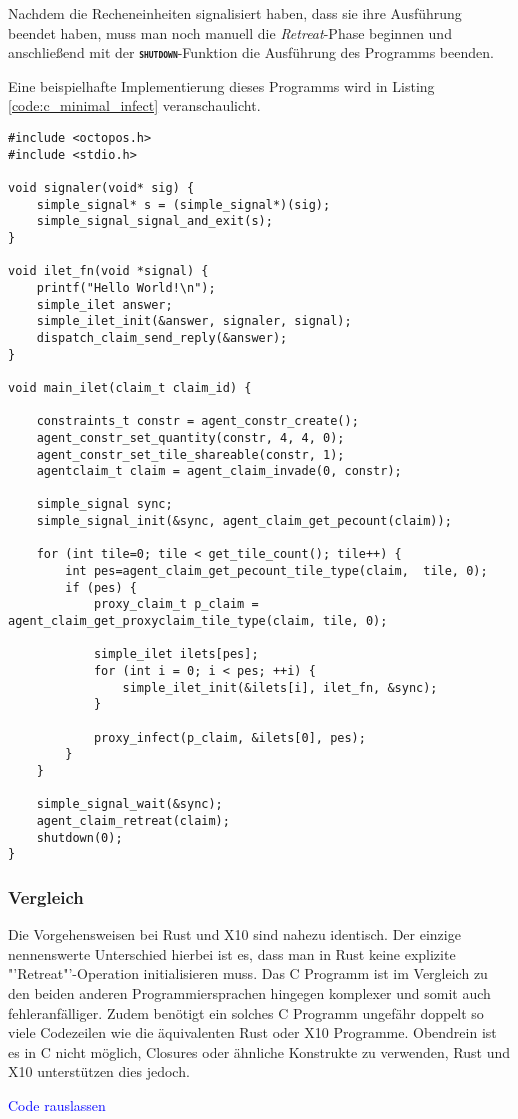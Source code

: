 Nachdem die Recheneinheiten signalisiert haben, dass sie ihre Ausführung beendet haben, muss man noch manuell
die \textit{Retreat}-Phase beginnen und anschließend mit der \texttt{\textsc{\textbf{shutdown}}}-Funktion
die Ausführung des Programms beenden.

Eine beispielhafte Implementierung dieses Programms wird in Listing \ref{code:c_minimal_infect} veranschaulicht.

\lstset{basicstyle=\tiny}
\begin{lstlisting}[float,caption={Minimales Invade, Infect, Retreat in C},label=code:c_minimal_infect]
#include <octopos.h>
#include <stdio.h>

void signaler(void* sig) {
    simple_signal* s = (simple_signal*)(sig);
    simple_signal_signal_and_exit(s);
}

void ilet_fn(void *signal) {
    printf("Hello World!\n");
    simple_ilet answer;
    simple_ilet_init(&answer, signaler, signal);
    dispatch_claim_send_reply(&answer);
}

void main_ilet(claim_t claim_id) {

    constraints_t constr = agent_constr_create();
    agent_constr_set_quantity(constr, 4, 4, 0);
    agent_constr_set_tile_shareable(constr, 1);
    agentclaim_t claim = agent_claim_invade(0, constr);

    simple_signal sync;
    simple_signal_init(&sync, agent_claim_get_pecount(claim));

    for (int tile=0; tile < get_tile_count(); tile++) {
        int pes=agent_claim_get_pecount_tile_type(claim,  tile, 0);
        if (pes) {
            proxy_claim_t p_claim = agent_claim_get_proxyclaim_tile_type(claim, tile, 0);

            simple_ilet ilets[pes];
            for (int i = 0; i < pes; ++i) {
                simple_ilet_init(&ilets[i], ilet_fn, &sync);
            }

            proxy_infect(p_claim, &ilets[0], pes);
        }
    }

    simple_signal_wait(&sync);
    agent_claim_retreat(claim);
    shutdown(0);
}
\end{lstlisting}
\lstset{basicstyle=\normalsize}

\subsubsection{Vergleich}

Die Vorgehensweisen bei Rust und X10 sind nahezu identisch. Der einzige nennenswerte Unterschied hierbei ist es, dass
man in Rust keine explizite "'Retreat"'-Operation initialisieren muss.
Das C Programm ist im Vergleich zu den beiden anderen Programmiersprachen hingegen komplexer und somit auch
fehleranfälliger. Zudem benötigt ein solches C Programm ungefähr doppelt so viele 
Codezeilen wie die äquivalenten Rust oder X10 Programme. Obendrein ist es in C nicht möglich, Closures oder
ähnliche Konstrukte zu verwenden, Rust und X10 unterstützen dies jedoch.

\textcolor{blue}{Code rauslassen}

